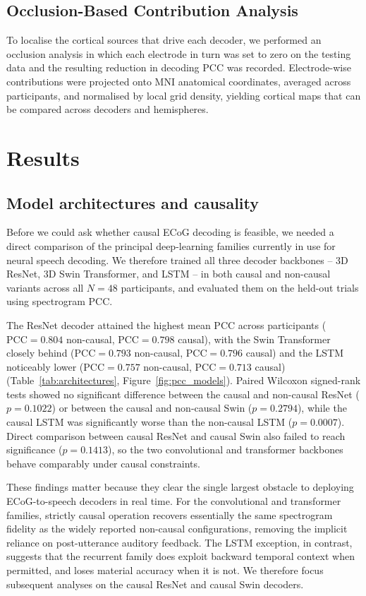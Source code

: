 \documentclass[11pt]{article}
\begin{document}
\subsection{Occlusion-Based Contribution Analysis}

To localise the cortical sources that drive each decoder, we performed an
occlusion analysis in which each electrode in turn was set to zero on the
testing data and the resulting reduction in decoding PCC was recorded.
Electrode-wise contributions were projected onto MNI anatomical
coordinates, averaged across participants, and normalised by local grid
density, yielding cortical maps that can be compared across decoders and
hemispheres.

\section{Results}

\subsection{Model architectures and causality}

Before we could ask whether causal ECoG decoding is feasible, we needed
a direct comparison of the principal deep-learning families currently in
use for neural speech decoding. We therefore trained all three decoder
backbones -- 3D ResNet, 3D Swin Transformer, and LSTM -- in both causal
and non-causal variants across all $N=48$ participants, and evaluated
them on the held-out trials using spectrogram PCC.

The ResNet decoder attained the highest mean PCC across participants
($\mathrm{PCC}=0.804$ non-causal, $\mathrm{PCC}=0.798$ causal), with the
Swin Transformer closely behind ($\mathrm{PCC}=0.793$ non-causal,
$\mathrm{PCC}=0.796$ causal) and the LSTM noticeably lower
($\mathrm{PCC}=0.757$ non-causal, $\mathrm{PCC}=0.713$ causal)
(Table~\ref{tab:architectures}, Figure~\ref{fig:pcc_models}). Paired
Wilcoxon signed-rank tests showed no significant difference between the
causal and non-causal ResNet ($p=0.1022$) or between the causal and
non-causal Swin ($p=0.2794$), while the causal LSTM was significantly
worse than the non-causal LSTM ($p=0.0007$). Direct comparison between
causal ResNet and causal Swin also failed to reach significance
($p=0.1413$), so the two convolutional and transformer backbones behave
comparably under causal constraints.

These findings matter because they clear the single largest obstacle to
deploying ECoG-to-speech decoders in real time. For the convolutional and
transformer families, strictly causal operation recovers essentially the
same spectrogram fidelity as the widely reported non-causal
configurations, removing the implicit reliance on post-utterance auditory
feedback. The LSTM exception, in contrast, suggests that the recurrent
family does exploit backward temporal context when permitted, and loses
material accuracy when it is not. We therefore focus subsequent analyses
on the causal ResNet and causal Swin decoders.
\end{document}
